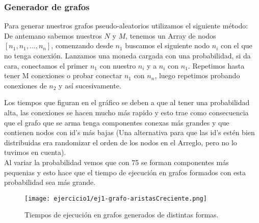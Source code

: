 \pagebreak
\subsubsection{Generador de grafos}
Para generar nuestros grafos pseudo-aleatorios utilizamos el siguiente m\'etodo:\\
De antemano sabemos nuestros $N$ y $M$, tenemos un Array de nodos $[n_1,n_1,...,n_n]$,  comenzando desde $n_1$ buscamos el siguiente nodo $n_i$ con el que no tenga conexi\'on. Lanzamos una moneda cargada con una probabilidad, si da cara, conectamos el primer $n_1$ con nuestro $n_i$ y a $n_i$ con $n_1$. Repetimos hasta tener M conexiones o probar conectar $n_1$ con $n_n$, luego repetimos probando conexiones de $n_2$ y as\'i sucesivamente.

Los tiempos que figuran en el gr\'afico se deben a que al tener una probabilidad alta, las conexiones se hacen mucho m\'as rapido y esto trae como consecuencia que el grafo que se arma tenga componentes conexas m\'as grandes y que contienen nodos con id's m\'as bajas (Una alternativa para que las id's est\'en bien distribuidas era randomizar el orden de los nodos en el Arreglo, pero no lo tuvimos en cuenta).\\

Al variar la probabilidad vemos que con 75 se forman componentes m\'as pequenias y esto hace que el tiempo de  ejecuci\'on en grafos formados con esta probabilidad sea m\'as grande.

\begin{figure}[h!]
\texttt{[image: ejercicio1/ej1-grafo-aristasCreciente.png]}
\centering
\caption{Tiempos de ejecuci\'on en grafos generados de distintas formas.}
\label{overflow3}
\end{figure}


\pagebreak